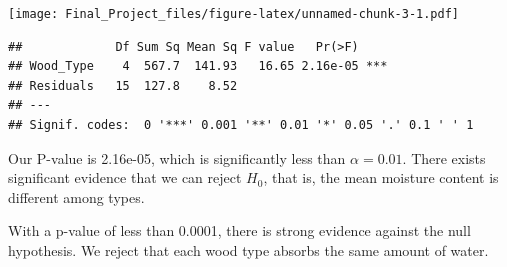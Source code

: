 \documentclass[
]{article}
\newenvironment{Shaded}{\begin{snugshade}}{\end{snugshade}}
\newcommand{\AttributeTok}[1]{\textcolor[rgb]{0.77,0.63,0.00}{#1}}
\newcommand{\DecValTok}[1]{\textcolor[rgb]{0.00,0.00,0.81}{#1}}
\newcommand{\FunctionTok}[1]{\textcolor[rgb]{0.00,0.00,0.00}{#1}}
\newcommand{\NormalTok}[1]{#1}
\newcommand{\OtherTok}[1]{\textcolor[rgb]{0.56,0.35,0.01}{#1}}
\newcommand{\SpecialCharTok}[1]{\textcolor[rgb]{0.00,0.00,0.00}{#1}}
\newcommand{\StringTok}[1]{\textcolor[rgb]{0.31,0.60,0.02}{#1}}
\begin{document}
\texttt{[image: Final\_Project\_files/figure-latex/unnamed-chunk-3-1.pdf]}

\begin{Shaded}
\end{Shaded}

\begin{verbatim}
##             Df Sum Sq Mean Sq F value   Pr(>F)    
## Wood_Type    4  567.7  141.93   16.65 2.16e-05 ***
## Residuals   15  127.8    8.52                     
## ---
## Signif. codes:  0 '***' 0.001 '**' 0.01 '*' 0.05 '.' 0.1 ' ' 1
\end{verbatim}

Our P-value is 2.16e-05, which is significantly less than
\(\alpha = 0.01\). There exists significant evidence that we can reject
\(H_0\), that is, the mean moisture content is different among types.

With a p-value of less than 0.0001, there is strong evidence against the
null hypothesis. We reject that each wood type absorbs the same amount
of water.
\end{document}
